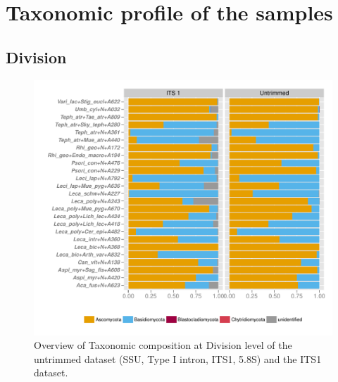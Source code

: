 \documentclass[a4paper, 11]{article}\usepackage[]{graphicx}\usepackage[]{color}
\makeatletter
\def\maxwidth{ %
  \ifdim\Gin@nat@width>\linewidth
    \linewidth
  \else
    \Gin@nat@width
  \fi
}
\newenvironment{knitrout}{}{} %
\makeatother
\begin{document}
\newpage
\section{Taxonomic profile of the samples}
\subsection{Division}
%
%
\begin{knitrout}
\color{fgcolor}\begin{figure}[H]
\includegraphics[width=\maxwidth]{figure/4_divisions-1} \caption[Overview of Taxonomic composition at Division level of the untrimmed dataset (SSU, Type I intron, ITS1, 5]{Overview of Taxonomic composition at Division level of the untrimmed dataset (SSU, Type I intron, ITS1, 5.8S) and the ITS1 dataset.}\label{fig:4_divisions}
\end{figure}


\end{knitrout}
%
%
%
%
\end{document}
